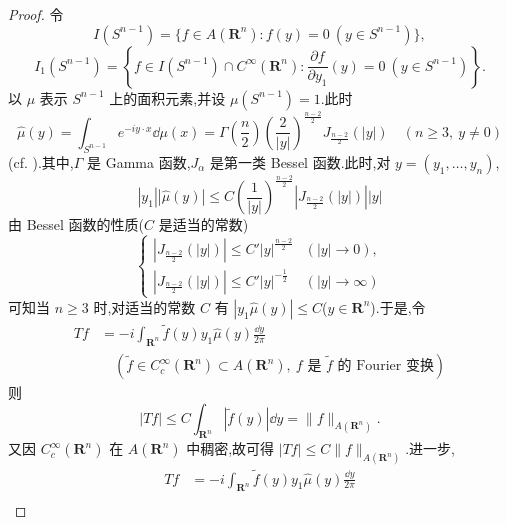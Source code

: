 \begin{proof}
令
\begin{equation*}
I(S^{n-1}) = \{f \in A(\mathbf{R}^{n}): f(y) = 0 \ (y \in S^{n-1})\},
\end{equation*}
\begin{equation*}
I_{1}(S^{n-1}) = \left\{f \in I(S^{n-1}) \cap C^{\infty}(\mathbf{R}^{n}): \frac{\partial f}{\partial y_{1}}(y) = 0 \ (y \in S^{n-1})\right\}.
\end{equation*}
以 $\mu$ 表示 $S^{n-1}$ 上的面积元素,并设 $\mu(S^{n-1}) = 1$.此时
\begin{equation*}
\widehat{\mu}(y) = \int_{S^{n-1}} e^{-iy \cdot x}\dd\mu(x) = \Gamma\left(\frac{n}{2}\right)\left(\frac{2}{|y|}\right)^{\frac{n-2}{2}} J_{\frac{n-2}{2}}(|y|) \quad (n \geq 3,\ y \neq 0)
\end{equation*}
(cf. \cite{ch3:11}).其中,$\Gamma$ 是 Gamma 函数,$J_{\alpha}$ 是第一类 Bessel 函数.此时,对 $y = (y_{1}, \ldots, y_{n})$,
\begin{equation*}
|y_{1}||\widehat{\mu}(y)| \leq C\left(\frac{1}{|y|}\right)^{\frac{n-2}{2}}\left|J_{\frac{n-2}{2}}(|y|)\right||y|
\end{equation*}
由 Bessel 函数的性质($C$ 是适当的常数)
\begin{equation*}
\left\{\begin{array}{ll}
\left|J_{\frac{n-2}{2}}(|y|)\right| \leq C'|y|^{\frac{n-2}{2}} & (|y| \to 0),\\
\left|J_{\frac{n-2}{2}}(|y|)\right| \leq C'|y|^{-\frac{1}{2}} & (|y| \to \infty)
\end{array}\right.
\end{equation*}
可知当 $n \geq 3$ 时,对适当的常数 $C$ 有 $|y_{1}\widehat{\mu}(y)| \leq C$($y \in \mathbf{R}^{n}$).于是,令
\begin{align*}
Tf &= -i\int_{\mathbf{R}^{n}}\tilde{f}(y)y_{1}\widehat{\mu}(y)\frac{\dd y}{2\pi}\\
&\quad \left(\tilde{f} \in C_{c}^{\infty}(\mathbf{R}^{n}) \subset A(\mathbf{R}^{n}),\ f \text{ 是 } \tilde{f} \text{ 的 Fourier 变换}\right)
\end{align*}
则
\begin{equation*}
|Tf| \leq C\int_{\mathbf{R}^{n}}|\tilde{f}(y)|\dd y = \|f\|_{A(\mathbf{R}^{n})}.
\end{equation*}
又因 $C_{c}^{\infty}(\mathbf{R}^{n})$ 在 $A(\mathbf{R}^{n})$ 中稠密,故可得 $|Tf| \leq C\|f\|_{A(\mathbf{R}^{n})}$.进一步,
\begin{align*}
Tf &= -i\int_{\mathbf{R}^{n}}\tilde{f}(y)y_{1}\widehat{\mu}(y)\frac{\dd y}{2\pi}\\

\end{align*}
\end{proof}
